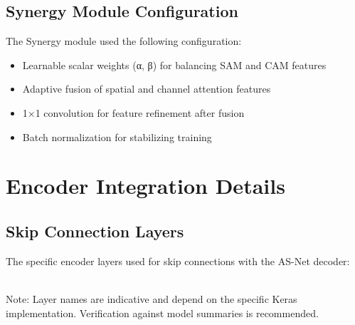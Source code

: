 \begin{theappendices}
  \section{Synergy Module Configuration}
  The Synergy module used the following configuration:
  \begin{itemize}
    \item Learnable scalar weights (α, β) for balancing SAM and CAM features
    \item Adaptive fusion of spatial and channel attention features
    \item 1×1 convolution for feature refinement after fusion
    \item Batch normalization for stabilizing training
  \end{itemize}

  \chapter{Encoder Integration Details}

  \section{Skip Connection Layers}
  The specific encoder layers used for skip connections with the AS-Net decoder:

  \begin{table}[h]
    \centering
    \caption{Encoder Skip Connection Layer Names}
    \label{tab:skip_connections}
    \setlength{\tabcolsep}{3pt}
    \footnotesize{\\ Note: Layer names are indicative and depend on the specific Keras implementation. Verification against model summaries is recommended.}
  \end{table}


\end{theappendices}
